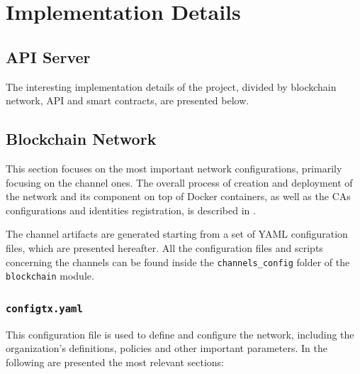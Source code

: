 \documentclass{scrartcl}
\begin{document}
\fi

\section{Implementation Details}

\subsection{API Server}

\iffalse

The interesting implementation details of the project, divided by blockchain network, API and smart contracts, are presented below.

\subsection{Blockchain Network}
\label{sec:blockchain-network-impl}

This section focuses on the most important network configurations, primarily focusing on the channel ones.
%
The overall process of creation and deployment of the network and its component on top of Docker containers, as well as the CAs configurations and identities registration, is described in .

The channel artifacts are generated starting from a set of YAML configuration files, which are presented hereafter.
%
All the configuration files and scripts concerning the channels can be found inside the \texttt{channels\_config} folder of the \texttt{blockchain} module.

\subsubsection*{\texttt{configtx.yaml}}

This configuration file is used to define and configure the network, including the organization's definitions, policies and other important parameters.
%
In the following are presented the most relevant sections:
\end{document}
